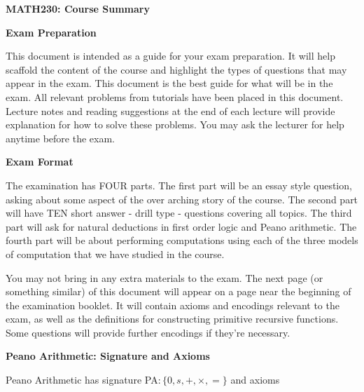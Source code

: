 \documentclass[11pt]{report}
\begin{document}
	
	
\begin{center}
	{\bf MATH230: Course Summary}
\end{center}
\begin{center}
	{\bf Exam Preparation}
\end{center}

This document is intended as a guide for your exam preparation. It will help scaffold the content of the course and highlight the types of questions that may appear in the exam. This document is the best guide for what will be in the exam. All relevant problems from tutorials have been placed in this document. Lecture notes and reading suggestions at the end of each lecture will provide explanation for how to solve these problems. You may ask the lecturer for help anytime before the exam.

\vspace{0.5cm}

{\bf Exam Format}

The examination has FOUR parts. The first part will be an essay style question, asking about some aspect of the over arching story of the course. The second part will have TEN short answer - drill type - questions covering all topics. The third part will ask for natural deductions in first order logic and Peano arithmetic. The fourth part will be about performing computations using each of the three models of computation that we have studied in the course. 

\vspace{0.5cm}

You may not bring in any extra materials to the exam. The next page (or something similar) of this document will appear on a page near the beginning of the examination booklet. It will contain axioms and encodings relevant to the exam, as well as the definitions for constructing primitive recursive functions. Some questions will provide further encodings if they're necessary.

\newpage

{\bf Peano Arithmetic: Signature and Axioms}

Peano Arithmetic has signature PA$: \{0,s,+,\times,=\}$ and axioms
	
\end{document}
